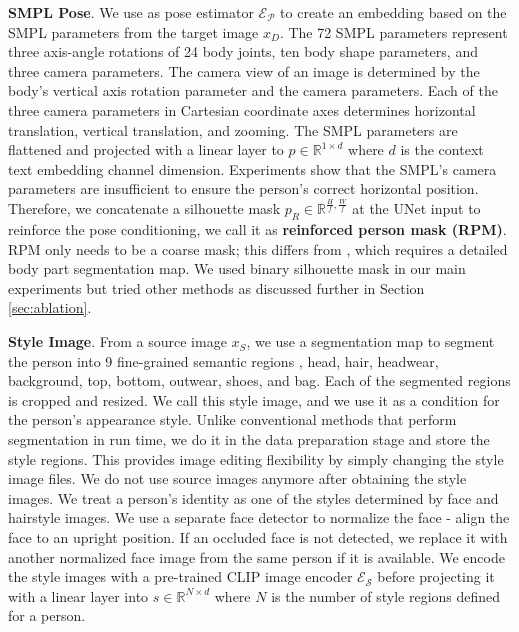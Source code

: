 \documentclass[10pt,twocolumn,letterpaper]{article}
\begin{document}
\noindent\textbf{SMPL Pose}. We use \cite{phosa} as pose estimator $\mathcal{E_P}$ to create an embedding based on the SMPL parameters from the target image $x_D$. The  72 SMPL parameters represent three axis-angle rotations of 24 body joints, ten body shape parameters, and three camera parameters. The camera view of an image is determined by the body's vertical axis rotation parameter and the camera parameters. Each of the three camera parameters in Cartesian coordinate axes determines horizontal translation, vertical translation, and zooming. The SMPL parameters are flattened and projected with a linear layer to $p \in \mathbb{R}^{1 \times d}$ where $d$ is the context text embedding channel dimension. Experiments show that the SMPL's camera parameters are insufficient to ensure the person's correct horizontal position. Therefore, we concatenate a silhouette mask $p_R \in \mathbb{R}^{\frac{H}{f}, \frac{W}{f}} $ at the UNet input to reinforce the pose conditioning, we call it as \textbf{reinforced person mask (RPM)}. RPM only needs to be a coarse mask; this differs from \cite{adgan, pise,spgnet,casd}, which requires a detailed body part segmentation map. We used binary silhouette mask in our main experiments but tried other methods as discussed further in Section \ref{sec:ablation}. 

\noindent\textbf{Style Image}. From a source image $x_S$, we use a segmentation map to segment the person into 9 fine-grained semantic regions \ie, head, hair, headwear, background, top, bottom, outwear, shoes, and bag. Each of the segmented regions is cropped and resized. We call this style image, and we use it as a condition for the person's appearance style. Unlike conventional methods that perform segmentation in run time, we do it in the data preparation stage and store the style regions. This provides image editing flexibility by simply changing the style image files. We do not use source images anymore after obtaining the style images. We treat a person's identity as one of the styles determined by face and hairstyle images. We use a separate face detector to normalize the face - align the face to an upright position. If an occluded face is not detected, we replace it with another normalized face image from the same person if it is available. We encode the style images with a pre-trained CLIP \cite{clip} image encoder $\mathcal{E_S}$ before projecting it with a linear layer into $s \in \mathbb{R}^{N \times d}$  where $N$ is the number of style regions defined for a person.
\end{document}
